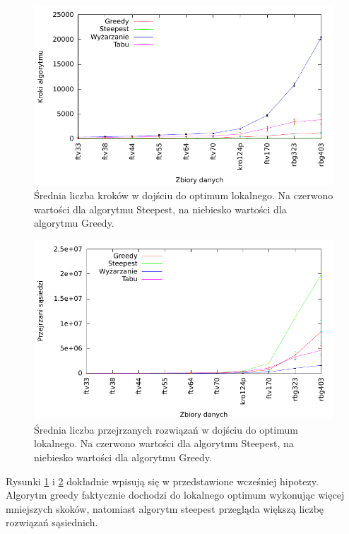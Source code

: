 \begin{figure}[!h]
\centering\includegraphics[width=12cm]{img/loc_skoki}
\caption{Średnia liczba kroków w dojściu do optimum lokalnego. Na czerwono wartości dla algorytmu Steepest, na niebiesko wartości dla algorytmu Greedy.}\label{rys:loc_skoki}
\end{figure}

\begin{figure}[!h]
\centering\includegraphics[width=12cm]{img/loc_sasiedzi}
\caption{Średnia liczba przejrzanych rozwiązań w dojściu do optimum lokalnego. Na czerwono wartości dla algorytmu Steepest, na niebiesko wartości dla algorytmu Greedy.}\label{rys:loc_sasiedzi}
\end{figure}

Rysunki \ref{rys:loc_skoki} i \ref{rys:loc_sasiedzi} dokładnie wpisują się w przedstawione wcześniej hipotezy. Algorytm greedy faktycznie dochodzi do lokalnego optimum wykonując więcej mniejszych skoków, natomiast algorytm steepest przegląda większą liczbę rozwiązań sąsiednich.
